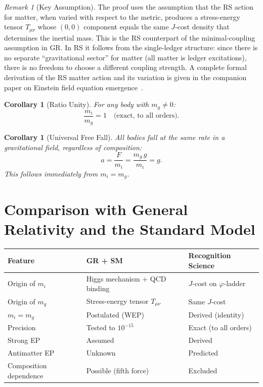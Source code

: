 \documentclass[12pt,a4paper]{article}
\newtheorem{corollary}[theorem]{Corollary}
\theoremstyle{definition}
\theoremstyle{remark}
\newtheorem{remark}[theorem]{Remark}
\begin{document}
\begin{remark}[Key Assumption]
\label{rem:assumption}
The proof uses the assumption that the RS action for matter, when
varied with respect to the metric, produces a stress-energy tensor
$T_{\mu\nu}$ whose $(0,0)$ component equals the same $J$-cost
density that determines the inertial mass.  This is the RS
counterpart of the minimal-coupling assumption in GR.  In RS it
follows from the single-ledger structure: since there is no separate
``gravitational sector'' for matter (all matter is ledger
excitations), there is no freedom to choose a different coupling
strength.  A complete formal derivation of the RS matter action and
its variation is given in the companion paper on Einstein field
equation emergence~\cite{RS_Axioms}.
\end{remark}

\begin{corollary}[Ratio Unity]
\label{cor:ratio}
For any body with $m_g \neq 0$:
\begin{equation}
  \frac{m_i}{m_g} = 1 \quad \text{(exact, to all orders).}
\end{equation}
\end{corollary}

\begin{corollary}[Universal Free Fall]
\label{cor:freefall}
All bodies fall at the same rate in a gravitational field,
regardless of composition:
\begin{equation}
  a = \frac{F}{m_i} = \frac{m_g\,g}{m_i} = g.
\end{equation}
This follows immediately from $m_i = m_g$.
\end{corollary}

\section{Comparison with General Relativity and the
Standard Model}
\label{sec:comparison}

\begin{center}
\renewcommand{\arraystretch}{1.3}
\begin{tabular}{lp{4.5cm}p{4.5cm}}
\toprule
\textbf{Feature} & \textbf{GR + SM} &
  \textbf{Recognition Science} \\
\midrule
Origin of $m_i$ & Higgs mechanism + QCD binding &
  $J$-cost on $\varphi$-ladder \\
Origin of $m_g$ & Stress-energy tensor $T_{\mu\nu}$ &
  Same $J$-cost \\
$m_i = m_g$ & Postulated (WEP) &
  Derived (identity) \\
Precision & Tested to $10^{-15}$ &
  Exact (to all orders) \\
Strong EP & Assumed & Derived \\
Antimatter EP & Unknown & Predicted \\
Composition dependence & Possible (fifth force) &
  Excluded \\
\bottomrule
\end{tabular}
\end{center}
\end{document}
